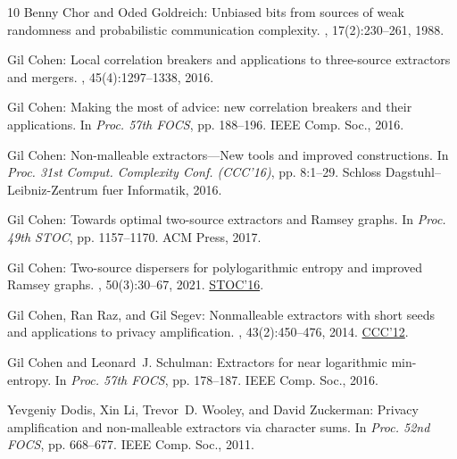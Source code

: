 \documentclass[11pt]{article}
\numberwithin{equation}{section}
\theoremstyle{definition}
\theoremstyle{plain}
\begin{document}
\begin{thebibliography}{10}
{\sc Benny Chor and Oded Goldreich}: Unbiased bits from sources of weak
  randomness and probabilistic communication complexity.
, 17(2):230--261, 1988.
\newblock [\epfmtdoi{10.1137/0217015}]

{\sc Gil Cohen}: Local correlation breakers and applications to three-source
  extractors and mergers.
, 45(4):1297--1338, 2016.
\newblock [\epfmtdoi{10.1137/15M1029837}]

{\sc Gil Cohen}: Making the most of advice: new correlation breakers and their
  applications.
\newblock In {\em Proc. 57th FOCS}, pp. 188--196. IEEE Comp. Soc., 2016.

{\sc Gil Cohen}: Non-malleable extractors---{N}ew tools and improved
  constructions.
\newblock In {\em Proc. 31st Comput. Complexity Conf. (CCC'16)}, pp. 8:1--29.
  Schloss Dagstuhl--Leibniz-Zentrum fuer Informatik, 2016.

{\sc Gil Cohen}: Towards optimal two-source extractors and {R}amsey graphs.
\newblock In {\em Proc. 49th STOC}, pp. 1157--1170. ACM Press, 2017.
\newblock [\epfmtdoi{10.1145/3055399.3055429}]

{\sc Gil Cohen}: Two-source dispersers for polylogarithmic entropy and improved
  {R}amsey graphs.
, 50(3):30--67, 2021.
\newblock \prelim \href{https://doi.org/10.1145/2897518.2897530}{STOC'16}.
\newblock [\epfmtdoi{10.1137/16M1096219}]

{\sc Gil Cohen, Ran Raz, and Gil Segev}: Nonmalleable extractors with short
  seeds and applications to privacy amplification.
, 43(2):450--476, 2014.
\newblock \prelim \href{https://doi.org/10.1109/CCC.2012.21}{CCC'12}.
\newblock [\epfmtdoi{10.1137/130908634}]

{\sc Gil Cohen and Leonard~J. Schulman}: Extractors for near logarithmic
  min-entropy.
\newblock In {\em Proc. 57th FOCS}, pp. 178--187. IEEE Comp. Soc., 2016.

{\sc Yevgeniy Dodis, Xin Li, Trevor~D. Wooley, and David Zuckerman}: Privacy
  amplification and non-malleable extractors via character sums.
\newblock In {\em Proc. 52nd FOCS}, pp. 668--677. IEEE Comp. Soc., 2011.


\end{thebibliography}
\end{document}
